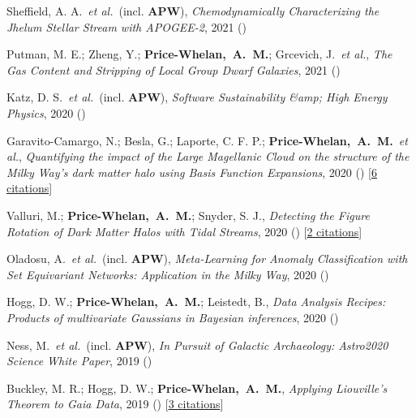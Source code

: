 \item[{\color{deemph}\scriptsize13}]Sheffield, A. A.~\textit{et al.}~(incl. \textbf{APW}), \textit{Chemodynamically Characterizing the Jhelum Stellar Stream with APOGEE-2}, 2021 ()

\item[{\color{deemph}\scriptsize12}]Putman, M. E.; Zheng, Y.; \textbf{Price-Whelan,~A.~M.}; Grcevich, J.~\textit{et al.}, \textit{The Gas Content and Stripping of Local Group Dwarf Galaxies}, 2021 ()

\item[{\color{deemph}\scriptsize11}]Katz, D. S.~\textit{et al.}~(incl. \textbf{APW}), \textit{Software Sustainability {\&}amp; High Energy Physics}, 2020 ()

\item[{\color{deemph}\scriptsize10}]Garavito-Camargo, N.; Besla, G.; Laporte, C. F. P.; \textbf{Price-Whelan,~A.~M.}~\textit{et al.}, \textit{Quantifying the impact of the Large Magellanic Cloud on the structure of the Milky Way's dark matter halo using Basis Function Expansions}, 2020 () [\href{http://adsabs.harvard.edu/abs/2020arXiv201000816G}{6 citations}]

\item[{\color{deemph}\scriptsize9}]Valluri, M.; \textbf{Price-Whelan,~A.~M.}; Snyder, S. J., \textit{Detecting the Figure Rotation of Dark Matter Halos with Tidal Streams}, 2020 () [\href{http://adsabs.harvard.edu/abs/2020arXiv200909004V}{2 citations}]

\item[{\color{deemph}\scriptsize8}]Oladosu, A.~\textit{et al.}~(incl. \textbf{APW}), \textit{Meta-Learning for Anomaly Classification with Set Equivariant Networks: Application in the Milky Way}, 2020 ()

\item[{\color{deemph}\scriptsize7}]Hogg, D. W.; \textbf{Price-Whelan,~A.~M.}; Leistedt, B., \textit{Data Analysis Recipes: Products of multivariate Gaussians in Bayesian inferences}, 2020 ()

\item[{\color{deemph}\scriptsize6}]Ness, M.~\textit{et al.}~(incl. \textbf{APW}), \textit{In Pursuit of Galactic Archaeology: Astro2020 Science White Paper}, 2019 ()

\item[{\color{deemph}\scriptsize5}]Buckley, M. R.; Hogg, D. W.; \textbf{Price-Whelan,~A.~M.}, \textit{Applying Liouville's Theorem to Gaia Data}, 2019 () [\href{http://adsabs.harvard.edu/abs/2019arXiv190700987B}{3 citations}]

